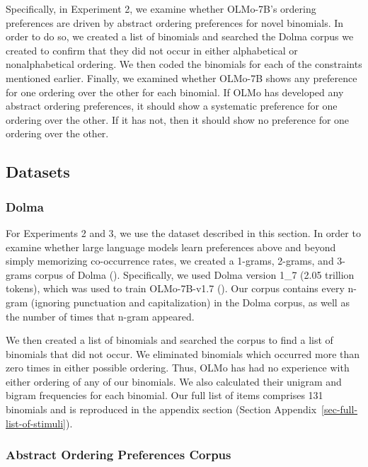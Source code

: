 \documentclass[
  12pt,
  letterpaper,
]{scrreprt}
\begin{document}
Specifically, in Experiment 2, we examine whether OLMo-7B's ordering
preferences are driven by abstract ordering preferences for novel
binomials. In order to do so, we created a list of binomials and
searched the Dolma corpus we created to confirm that they did not occur
in either alphabetical or nonalphabetical ordering. We then coded the
binomials for each of the constraints mentioned earlier. Finally, we
examined whether OLMo-7B shows any preference for one ordering over the
other for each binomial. If OLMo has developed any abstract ordering
preferences, it should show a systematic preference for one ordering
over the other. If it has not, then it should show no preference for one
ordering over the other.

\subsection{Datasets}\label{datasets}

\subsubsection{Dolma}\label{dolma}

For Experiments 2 and 3, we use the dataset described in this section.
In order to examine whether large language models learn preferences
above and beyond simply memorizing co-occurrence rates, we created a
1-grams, 2-grams, and 3-grams corpus of Dolma
().
Specifically, we used Dolma version 1\_7 (2.05 trillion tokens), which
was used to train OLMo-7B-v1.7
(). Our corpus contains every n-gram (ignoring punctuation and
capitalization) in the Dolma corpus, as well as the number of times that
n-gram appeared.

We then created a list of binomials and searched the corpus to find a
list of binomials that did not occur. We eliminated binomials which
occurred more than zero times in either possible ordering. Thus, OLMo
has had no experience with either ordering of any of our binomials. We
also calculated their unigram and bigram frequencies for each binomial.
Our full list of items comprises 131 binomials and is reproduced in the
appendix section (Section Appendix~\ref{sec-full-list-of-stimuli}).

\subsubsection{Abstract Ordering Preferences
Corpus}\label{abstract-ordering-preferences-corpus}
\end{document}
